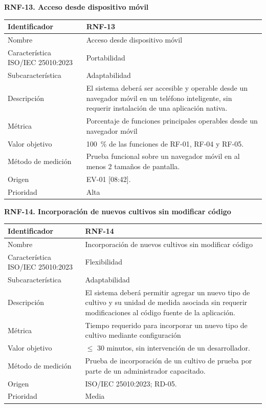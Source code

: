 \documentclass[12pt,a4paper]{article}
\begin{document}
\bigskip
\noindent\textbf{RNF-13. Acceso desde dispositivo móvil}
\label{tab:RNF-13}

\begin{center}
\begin{longtable}{|p{4.2cm}|p{10cm}|}
\hline
Identificador & RNF-13 \\
\hline
Nombre & Acceso desde dispositivo móvil \\
\hline
Característica ISO/IEC 25010:2023 & Portabilidad \\
\hline
Subcaracterística & Adaptabilidad \\
\hline
Descripción & El sistema deberá ser accesible y operable desde un navegador móvil en un teléfono inteligente, sin requerir instalación de una aplicación nativa. \\
\hline
Métrica & Porcentaje de funciones principales operables desde un navegador móvil \\
\hline
Valor objetivo & 100~\% de las funciones de RF-01, RF-04 y RF-05. \\
\hline
Método de medición & Prueba funcional sobre un navegador móvil en al menos 2 tamaños de pantalla. \\
\hline
Origen & EV-01 [08:42]. \\
\hline
Prioridad & Alta \\
\hline
\end{longtable}
\end{center}

\bigskip
\noindent\textbf{RNF-14. Incorporación de nuevos cultivos sin modificar código}
\label{tab:RNF-14}

\begin{center}
\begin{longtable}{|p{4.2cm}|p{10cm}|}
\hline
Identificador & RNF-14 \\
\hline
Nombre & Incorporación de nuevos cultivos sin modificar código \\
\hline
Característica ISO/IEC 25010:2023 & Flexibilidad \\
\hline
Subcaracterística & Adaptabilidad \\
\hline
Descripción & El sistema deberá permitir agregar un nuevo tipo de cultivo y su unidad de medida asociada sin requerir modificaciones al código fuente de la aplicación. \\
\hline
Métrica & Tiempo requerido para incorporar un nuevo tipo de cultivo mediante configuración \\
\hline
Valor objetivo & $\leq$ 30 minutos, sin intervención de un desarrollador. \\
\hline
Método de medición & Prueba de incorporación de un cultivo de prueba por parte de un administrador capacitado. \\
\hline
Origen & ISO/IEC 25010:2023; RD-05. \\
\hline
Prioridad & Media \\
\hline
\end{longtable}
\end{center}
\end{document}
